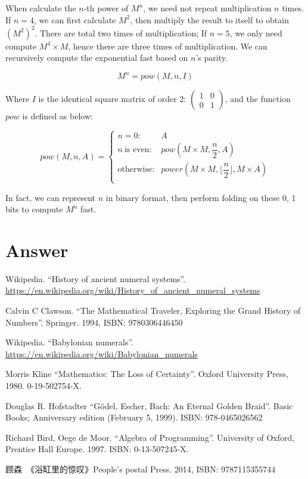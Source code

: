\documentclass[b5paper]{article}
\begin{document}
\begin{Answer}[ref = {ex:fibonacci-matrix}]
{When calculate the $n$-th power of $M^n$, we need not repeat multiplication $n$ times. If $n = 4$, we can first calculate $M^2$, then multiply the result to itself to obtain $(M^2)^2$. There are total two times of multiplication; If $n = 5$, we only need compute $M^4 \times M$, hence there are three times of multiplication. We can recursively compute the exponential fast based on $n$'s parity.

\[
M^n = pow(M, n, I)
\]

Where $I$ is the identical square matrix of order 2: $\displaystyle \begin{pmatrix} 1 & 0 \\ 0 & 1\end{pmatrix}$, and the function $pow$ is defined as below:

\[
pow(M, n, A) = \begin{cases}
n = 0: & A \\
n\ \text{is even}: & pow(M \times M, \dfrac{n}{2}, A) \\
\text{otherwise}: & power(M \times M, \lfloor \dfrac{n}{2} \rfloor, M \times A)\\
\end{cases}
\]

In fact, we can represent $n$ in binary format, then perform folding on these 0, 1 bits to compute $M^n$ fast.
}
\end{Answer}

\ifx\wholebook\relax \else
\section{Answer}
\shipoutAnswer

\begin{thebibliography}{99}

Wikipedia. ``History of ancient numeral systems''. \url{https://en.wikipedia.org/wiki/History_of_ancient_numeral_systems}

Calvin C Clawson. ``The Mathematical Traveler, Exploring the Grand History of Numbers''. Springer. 1994, ISBN: 9780306446450

Wikipedia. ``Babylonian numerals''. \url{https://en.wikipedia.org/wiki/Babylonian_numerals}

Morris Kline ``Mathematics: The Loss of Certainty''. Oxford University Press, 1980. 0-19-502754-X.

Douglas R. Hofstadter ``Gödel, Escher, Bach: An Eternal Golden Braid''. Basic Books; Anniversary edition (February 5, 1999). ISBN: 978-0465026562

Richard Bird, Oege de Moor. ``Algebra of Programming''. University of Oxford, Prentice Hall Europe. 1997. ISBN: 0-13-507245-X.

顾森\ 《浴缸里的惊叹》People's postal Press. 2014, ISBN: 9787115355744

\end{thebibliography}

\expandafter\enddocument

\fi
\end{document}
